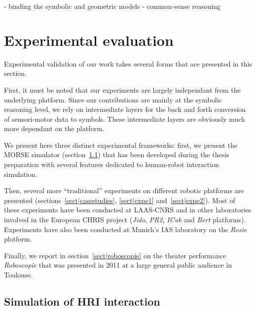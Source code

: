 - binding the symbolic and geometric models
- common-sense reasoning





\section{Experimental evaluation}
\label{sect|experimental-evaluation}

Experimental validation of our work takes several forms that are presented in
this section.

First, it must be noted that our experiments are largely independant from the
underlying platform. Since our contributions are mainly at the symbolic
reasoning level, we rely on intermediate layers for the back and forth
conversion of sensori-motor data to symbols. These intermediate layers are
obviously much more dependant on the platform.

We present here three distinct experimental frameworks: first, we present the
MORSE simulator (section~\ref{sect|simulation}) that has been developed during
the thesis preparation with several features dedicated to human-robot
interaction simulation.

Then, several more ``traditional'' experiments on different robotic platforms
are presented (sections~\ref{sect|casestudies}, \ref{sect|expe1}
and~\ref{sect|expe2}). Most of these experiments have been conducted at
LAAS-CNRS and in other laboratories involved in the European CHRIS project
(\emph{Jido}, \emph{PR2}, \emph{ICub} and \emph{Bert} platforms).  Experiments
have also been conducted at Munich's IAS laboratory on the \emph{Rosie}
platform.

Finally, we report in section~\ref{sect|roboscopie} on the theater performance
\emph{Roboscopie} that was presented in 2011 at a large general public audience
in Toulouse.

\subsection{Simulation of HRI interaction}
\label{sect|simulation}

